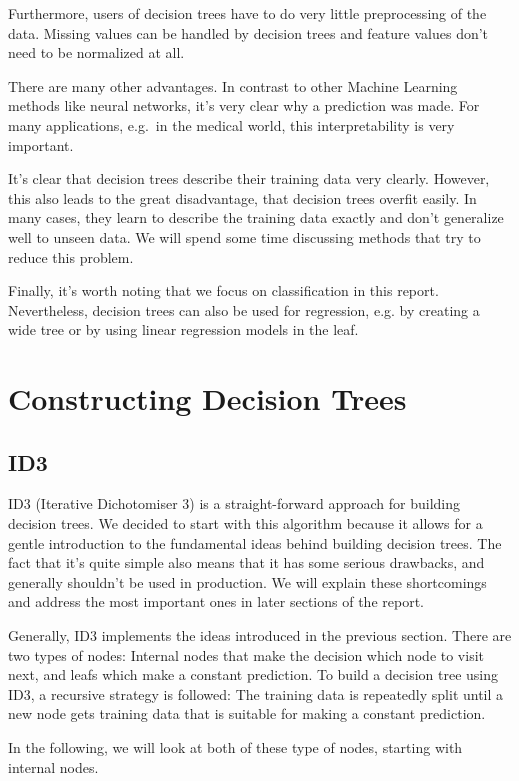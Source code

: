 \documentclass[a4paper]{article}
\begin{document}
Furthermore, users of decision trees have to do very little preprocessing of the data. Missing values can be handled by decision trees and feature values don't need to be normalized at all.

There are many other advantages. In contrast to other Machine Learning methods like neural networks, it's very clear why a prediction was made. For many applications, e.g.\ in the medical world, this interpretability is very important.

It's clear that decision trees describe their training data very clearly. However, this also leads to the great disadvantage, that decision trees overfit easily. In many cases, they learn to describe the training data exactly and don't generalize well to unseen data. We will spend some time discussing methods that try to reduce this problem.

Finally, it's worth noting that we focus on classification in this report. Nevertheless, decision trees can also be used for regression, e.g. by creating a wide tree or by using linear regression models in the leaf.

\section{Constructing Decision Trees}

\subsection{ID3}

ID3 (Iterative Dichotomiser 3) is a straight-forward approach for building decision trees. We decided to start with this algorithm because it allows for a gentle introduction to the fundamental ideas behind building decision trees.
The fact that it's quite simple also means that it has some serious drawbacks, and generally shouldn't be used in production. We will explain these shortcomings and address the most important ones in later sections of the report.

Generally, ID3 implements the ideas introduced in the previous section. There are two types of nodes: Internal nodes that make the decision which node to visit next, and leafs  which make a constant prediction.
To build a decision tree using ID3, a recursive strategy is followed: The training data is repeatedly split until a new node gets training data that is suitable for making a constant prediction.

In the following, we will look at both of these type of nodes, starting with internal nodes.
\end{document}
